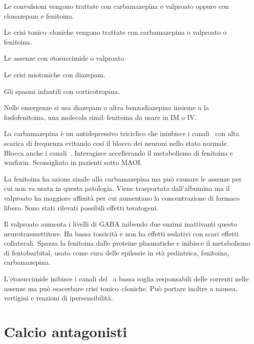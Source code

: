 Le convulsioni vengono trattate con carbamazepina e valproato oppure con clonazepam e fenitoina. 

Le crisi tonico--cloniche vengono trattate con carbamazepina o valproato o fenitoina.

Le assenze con etosuccimide o valproato.

Le crisi miotoniche con diazepam.

Gli spasmi infantili con corticotropina.

Nelle emergenze si usa diazepam o altra benzodiazepina insieme a la fosfofenitoina, una molecola simil--fenitoina da usare in IM o IV.

La carbamazepina è un antidepressivo triciclico che ininbisce i canali~ con alta scarica di frequenza evitando cosi il blocco dei neuroni nello stato normale. Blocca anche i canali~. Interagisce accellerando il metabolismo di fenitoina e warfarin. Sconsigliato in pazienti sotto MAOI. 

La fenitoina ha azione simile alla carbamazepina ma può causare le assenze per cui non va usata in questa patologia. Viene trasportata dall'albumina ma il valproato ha maggiore affinità per cui aumentano la concentrazione di farmaco libero. Sono stati rilevati possibili effetti teratogeni.

Il valproato aumenta i livelli di GABA inibendo due enzimi inattivanti questo neurotrasmettitore. Ha bassa tossicità e non ha effetti sedativi con scari effetti collaterali. Spazza la fenitoina dalle proteine plasmatiche e inibisce il metabolismo di fentobarbital, usato come cura delle epilessie in età pediatrica, fenitoina, carbamazepina.

L'etosuccimide inibisce i canali del~ a bassa soglia responsabili delle correnti nelle assenze ma può esacerbare crisi tonico--cloniche. Può portare inoltre a nausea, vertigini e reazioni di ipersensibilità.

\section{Calcio antagonisti}

